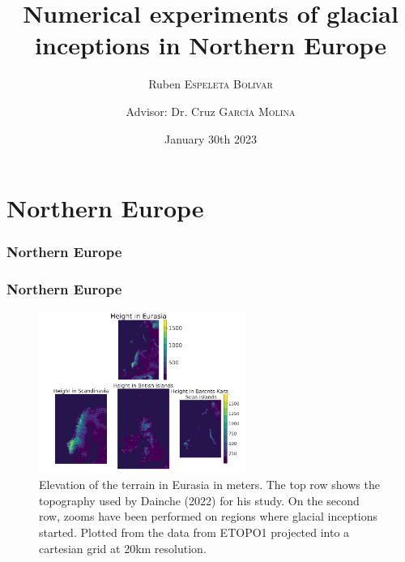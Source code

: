 \documentclass[11pt]{beamer}
\author{Ruben \textsc{Espeleta Bolivar}\\ \and {Advisor: Dr. Cruz \textsc{García Molina}}}
\title{Numerical experiments of glacial inceptions in Northern Europe}
\institute{Institut des geosciences de l'environnement}
\date{\small{January 30th 2023}}
\begin{document}
 \begin{frame}
	\titlepage
\end{frame}
\section{Northern Europe}
\frametitle{Northern Europe}
	\begin{frame}
		\frametitle{Northern Europe}
		\begin{center}
			 \begin{figure}[!h]
				\includegraphics[width=0.6\textwidth]{../fig/Northern_europe.png} %
				\caption{\footnotesize Elevation of the terrain in Eurasia in meters. The top row shows the topography used by Dainche (2022) for his study. On the second row, zooms have been performed on regions where glacial inceptions started. Plotted from the data from ETOPO1 projected into a cartesian grid at 20km resolution. }
			\end{figure}
		\end{center}
	\end{frame}
\end{document}
